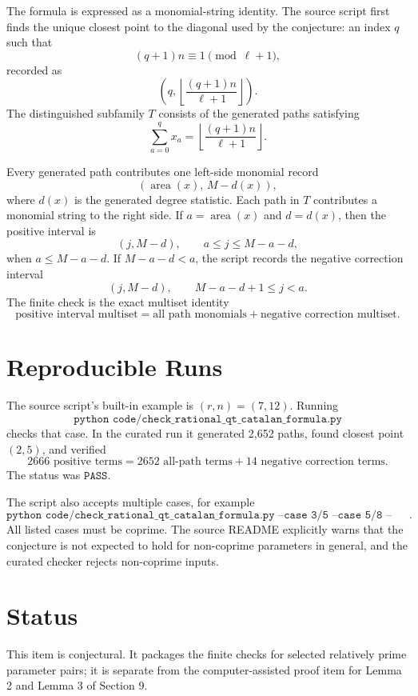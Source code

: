 \documentclass{article}
\begin{document}
The formula is expressed as a monomial-string identity.  The source script
first finds the unique closest point to the diagonal used by the conjecture:
an index \(q\) such that
\[
  (q+1)n\equiv 1 \pmod{\ell+1},
\]
recorded as
\[
  \left(q,\left\lfloor\frac{(q+1)n}{\ell+1}\right\rfloor\right).
\]
The distinguished subfamily \(T\) consists of the generated paths satisfying
\[
  \sum_{a=0}^{q}x_a
  =
  \left\lfloor\frac{(q+1)n}{\ell+1}\right\rfloor .
\]

Every generated path contributes one left-side monomial record
\[
  (\operatorname{area}(x),\,M-d(x)),
\]
where \(d(x)\) is the generated degree statistic.  Each path in \(T\) contributes
a monomial string to the right side.  If \(a=\operatorname{area}(x)\) and
\(d=d(x)\), then the positive interval is
\[
  (j,M-d),\qquad a\le j\le M-a-d,
\]
when \(a\le M-a-d\).  If \(M-a-d<a\), the script records the negative correction
interval
\[
  (j,M-d),\qquad M-a-d+1\le j<a.
\]
The finite check is the exact multiset identity
\[
  \text{positive interval multiset}
  =
  \text{all path monomials}+\text{negative correction multiset}.
\]

\section{Reproducible Runs}

The source script's built-in example is \((r,n)=(7,12)\).  Running
\[
  \texttt{python code/check\_rational\_qt\_catalan\_formula.py}
\]
checks that case.  In the curated run it generated 2,652 paths, found closest
point \((2,5)\), and verified
\[
  2666\text{ positive terms}
  =
  2652\text{ all-path terms}
  +
  14\text{ negative correction terms}.
\]
The status was \(\texttt{PASS}\).

The script also accepts multiple cases, for example
\[
  \texttt{python code/check\_rational\_qt\_catalan\_formula.py
  --case 3/5 --case 5/8 --case 7/12}.
\]
All listed cases must be coprime.  The source README explicitly warns that the
conjecture is not expected to hold for non-coprime parameters in general, and
the curated checker rejects non-coprime inputs.

\section{Status}

This item is conjectural.  It packages the finite checks for selected
relatively prime parameter pairs; it is separate from the computer-assisted
proof item for Lemma 2 and Lemma 3 of Section 9.
\end{document}
